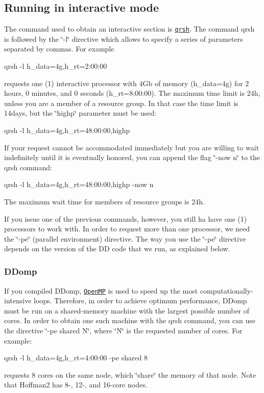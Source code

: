 \subparagraph*{}\hypertarget{hoffman2_hoffma2_dd_interactive}{}\subsection{Running in interactive mode}\label{hoffman2_hoffma2_dd_interactive}
The command used to obtain an interactive section is \href{http://hpc.ucla.edu/hoffman2/computing/sge_qrsh.php}{\tt qrsh}. The command qrsh is followed by the \char`\"{}-\/l\char`\"{} directive which allows to specify a series of parameters separated by commas. For example \begin{DoxyVerb}qrsh -l h_data=4g,h_rt=2:00:00
\end{DoxyVerb}
 requests one (1) interactive processor with 4\+Gb of memory (h\+\_\+data=4g) for 2 hours, 0 minutes, and 0 seconds (h\+\_\+rt=8\+:00\+:00). The maximum time limit is 24h, unless you are a member of a resource group. In that case the time limit is 14days, but the \char`\"{}highp\char`\"{} parameter must be used\+: \begin{DoxyVerb}qrsh -l h_data=4g,h_rt=48:00:00,highp
\end{DoxyVerb}
 If your request cannot be accommodated immediately but you are willing to wait indefinitely until it is eventually honored, you can append the flag \char`\"{}-\/now n\char`\"{} to the qrsh command\+: \begin{DoxyVerb}qrsh -l h_data=4g,h_rt=48:00:00,highp -now n
\end{DoxyVerb}
 The maximum wait time for members of resource groups is 24h.

If you issue one of the previous commands, however, you still ha have one (1) processors to work with. In order to request more than one processor, we need the \char`\"{}-\/pe\char`\"{} (parallel environment) directive. The way you use the \char`\"{}-\/pe\char`\"{} directive depends on the version of the D\+D code that we run, as explained below.

\subparagraph*{}\hypertarget{hoffman2_hoffma2_dd_interactive_DDomp}{}\subsubsection{D\+Domp}\label{hoffman2_hoffma2_dd_interactive_DDomp}
If you compiled D\+Domp, \href{http://openmp.org}{\tt Open\+M\+P} is used to speed up the most computationally-\/intensive loops. Therefore, in order to achieve optimum performance, D\+Domp must be run on a shared-\/memory machine with the largest possible number of cores. In order to obtain one such machine with the qrsh command, you can use the directive \char`\"{}-\/pe shared N\char`\"{}, where \char`\"{}\+N\char`\"{} is the requested number of cores. For example\+: \begin{DoxyVerb}qrsh -l h_data=4g,h_rt=4:00:00 -pe shared 8
\end{DoxyVerb}
 requests 8 cores on the same node, which \char`\"{}share\char`\"{} the memory of that node. Note that Hoffman2 has 8-\/, 12-\/, and 16-\/core nodes.

